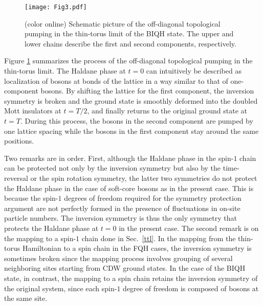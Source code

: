 \documentclass[aps,prb,twocolumn,superscriptaddress,showpacs,floatfix]{revtex4-1}
\begin{document}
\begin{figure}
\texttt{[image: Fig3.pdf]}
\caption{(color online) Schematic picture of the off-diagonal topological pumping in the thin-torus limit of the BIQH state. 
The upper and lower chains describe the first and second components, respectively. }
\label{fig_pump}
\end{figure}

Figure \ref{fig_pump} summarizes the process of the off-diagonal topological pumping in the thin-torus limit. 
The Haldane phase at $t=0$ can intuitively be described as localization of bosons at bonds of the lattice in a way similar to that of one-component bosons.\cite{Berg} By shifting the lattice for the first component, the inversion symmetry is broken and the ground state is smoothly deformed into the doubled Mott insulators at $t=T/2$, and finally returns to the original ground state at $t=T$. During this process, the bosons in the second component are pumped by one lattice spacing while the bosons in the first component stay around the same positions.

Two remarks are in order. 
First, although the Haldane phase in the spin-$1$ chain can be protected not only by the inversion symmetry but also by the time-reversal or the spin rotation symmetry,\cite{GuWen, Pollmann1, Pollmann2} the latter two symmetries do not protect the Haldane phase in the case of soft-core bosons as in the present case.\cite{DallaTorre, Berg, BergLevinAltman} 
This is because the spin-$1$ degrees of freedom required for the symmetry protection argument are not perfectly formed in the presence of fluctuations in on-site particle numbers.  
The inversion symmetry is thus the only symmetry that protects the Haldane phase at $t=0$ in the present case. 
The second remark is on the mapping to a spin-$1$ chain done in Sec.~\ref{ttl}. In the mapping from the thin-torus Hamiltonian to a spin chain in the FQH cases, the inversion symmetry is sometimes broken since the mapping process involves grouping of several neighboring sites starting from CDW ground states.\cite{Nakamura, Wang} In the case of the BIQH state, in contrast, the mapping to a spin chain retains the inversion symmetry of the original system, since each spin-$1$ degree of freedom is composed of bosons at the same site. 
\end{document}
